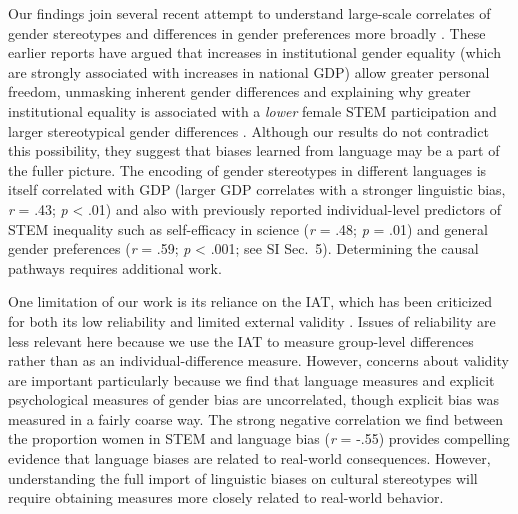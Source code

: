 \documentclass[9pt,twocolumn,twoside,lineno]{pnas-new}
\begin{document}
Our findings join several recent attempt to understand large-scale correlates of gender stereotypes 
\cite{stoet2018gender} and differences in gender preferences more broadly \cite{falk2018relationship}. These earlier reports have argued that increases in institutional gender equality (which are strongly associated with increases in national GDP) allow greater personal freedom, unmasking inherent gender differences and explaining why greater institutional equality is associated with a \textit{lower} female STEM participation \cite{stoet2018gender} and larger stereotypical gender differences \citep[e.g., women being more risk averse and less patient than men;][]{falk2018relationship}. Although our results do not contradict this possibility, they suggest that biases learned from language may be a part of the fuller picture. The encoding of gender stereotypes in different languages is itself correlated with GDP (larger GDP correlates with a stronger linguistic bias, \emph{r} = .43; \emph{p} \textless{} .01) and also with previously reported individual-level predictors of STEM inequality such as self-efficacy in science  (\emph{r} = .48; \emph{p} = .01) and general gender preferences (\emph{r} = .59; \emph{p} < .001; see SI Sec.\ 5). Determining the causal pathways requires additional work. 

One limitation of our work is its reliance on the IAT, which has been criticized for both its low reliability \cite{lane2007understanding} and limited external validity \cite{fazio2003implicit}. Issues of reliability are less relevant here because we use the IAT to measure group-level differences rather than as an individual-difference measure. However, concerns about validity are important particularly because we find that language measures and explicit psychological measures of gender bias are uncorrelated, though explicit bias was measured in a fairly coarse way. The strong negative correlation we find between the proportion women in STEM and language bias (\emph{r} = -.55) provides compelling evidence that language biases are related to real-world consequences. However, understanding the full import of linguistic biases on cultural stereotypes will require obtaining measures more closely related to real-world behavior. 
\end{document}

